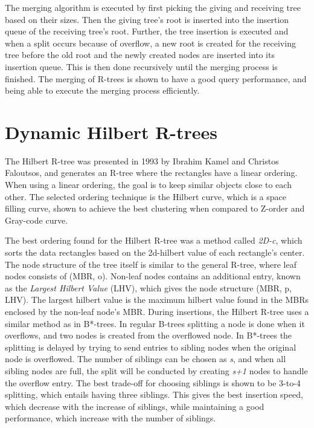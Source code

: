 \noindent
The merging algorithm is executed by first picking the giving and receiving tree based on their sizes. Then the giving tree's root is inserted into the insertion queue of the receiving tree's root. Further, the tree insertion is executed and when a split occurs because of overflow, a new root is created for the receiving tree before the old root and the newly created nodes are inserted into its insertion queue. This is then done recursively until the merging process is finished. The merging of R-trees is shown to have a good query performance, and being able to execute the merging process efficiently\cite{MergingRtree}.

\section{Dynamic Hilbert R-trees}
The Hilbert R-tree was presented in 1993 by Ibrahim Kamel and Christos Faloutsos\cite{HilbertRTree}, and generates an R-tree where the rectangles have a linear ordering. When using a linear ordering, the goal is to keep similar objects close to each other. The selected ordering technique is the Hilbert curve, which is a space filling curve, shown to achieve the best clustering when compared to Z-order and Gray-code curve\cite{AnalysisHilbert}.\newline

\noindent
The best ordering found for the Hilbert R-tree was a method called \emph{2D-c}, which sorts the data rectangles based on the 2d-hilbert value of each rectangle's center. The node structure of the tree itself is similar to the general R-tree, where leaf nodes consists of (MBR, o). Non-leaf nodes contains an additional entry, known as the \emph{Largest Hilbert Value} (LHV), which gives the node structure (MBR, p, LHV). The largest hilbert value is the maximum hilbert value found in the MBRs enclosed by the non-leaf node's MBR. During insertions, the Hilbert R-tree uses a similar method as in B*-trees. In regular B-trees splitting a node is done when it overflows, and two nodes is created from the overflowed node. In B*-trees the splitting is delayed by trying to send entries to sibling nodes when the original node is overflowed. The number of siblings can be chosen as \emph{s}, and when all sibling nodes are full, the split will be conducted by creating \emph{s+1} nodes to handle the overflow entry. The best trade-off for choosing siblings is shown to be 3-to-4 splitting, which entails having three siblings. This gives the best insertion speed, which decrease with the increase of siblings, while maintaining a good performance, which increase with the number of siblings.\newline 

